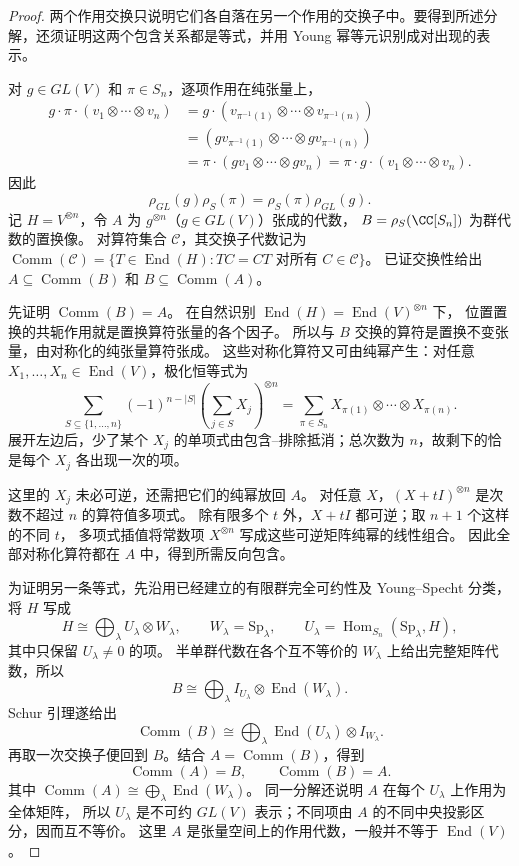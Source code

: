 \begin{proof}
两个作用交换只说明它们各自落在另一个作用的交换子中。要得到所述分解，还须证明这两个包含关系都是等式，并用 Young 幂等元识别成对出现的表示。

对 $g\in GL(V)$ 和 $\pi\in S_n$，逐项作用在纯张量上，
\begin{align*}
g\cdot\pi\cdot(v_1\otimes\cdots\otimes v_n)
&=g\cdot(v_{\pi^{-1}(1)}\otimes\cdots\otimes v_{\pi^{-1}(n)})\\
&=(gv_{\pi^{-1}(1)}\otimes\cdots\otimes gv_{\pi^{-1}(n)})\\
&=\pi\cdot(gv_1\otimes\cdots\otimes gv_n)
=\pi\cdot g\cdot(v_1\otimes\cdots\otimes v_n).
\end{align*}
因此
\[
\rho_{GL}(g)\rho_S(\pi)=\rho_S(\pi)\rho_{GL}(g).
\]
记 $H=V^{\otimes n}$，令 $A$ 为 $g^{\otimes n}$（$g\in GL(V)$）张成的代数，
$B=\rho_S(\CC[S_n])$ 为群代数的置换像。
对算符集合 $\mathcal C$，其交换子代数记为
$\operatorname{Comm}(\mathcal C)=\{T\in\operatorname{End}(H):TC=CT\text{ 对所有 }C\in\mathcal C\}$。
已证交换性给出 $A\subseteq\operatorname{Comm}(B)$ 和 $B\subseteq\operatorname{Comm}(A)$。

先证明 $\operatorname{Comm}(B)=A$。
在自然识别 $\operatorname{End}(H)=\operatorname{End}(V)^{\otimes n}$ 下，
位置置换的共轭作用就是置换算符张量的各个因子。
所以与 $B$ 交换的算符是置换不变张量，由对称化的纯张量算符张成。
这些对称化算符又可由纯幂产生：对任意 $X_1,\ldots,X_n\in\operatorname{End}(V)$，极化恒等式为
\[
\sum_{S\subseteq\{1,\ldots,n\}}(-1)^{n-|S|}
 \left(\sum_{j\in S}X_j\right)^{\otimes n}
=\sum_{\pi\in S_n}X_{\pi(1)}\otimes\cdots\otimes X_{\pi(n)}.
\]
展开左边后，少了某个 $X_j$ 的单项式由包含--排除抵消；总次数为 $n$，故剩下的恰是每个 $X_j$ 各出现一次的项。

这里的 $X_j$ 未必可逆，还需把它们的纯幂放回 $A$。
对任意 $X$，$(X+tI)^{\otimes n}$ 是次数不超过 $n$ 的算符值多项式。
除有限多个 $t$ 外，$X+tI$ 都可逆；取 $n+1$ 个这样的不同 $t$，
多项式插值将常数项 $X^{\otimes n}$ 写成这些可逆矩阵纯幂的线性组合。
因此全部对称化算符都在 $A$ 中，得到所需反向包含。

为证明另一条等式，先沿用已经建立的有限群完全可约性及 Young--Specht 分类，将 $H$ 写成
\[
H\cong\bigoplus_\lambda U_\lambda\otimes W_\lambda,
\qquad W_\lambda=\mathrm{Sp}_\lambda,
\qquad U_\lambda=\operatorname{Hom}_{S_n}(\mathrm{Sp}_\lambda,H),
\]
其中只保留 $U_\lambda\ne0$ 的项。
半单群代数在各个互不等价的 $W_\lambda$ 上给出完整矩阵代数，所以
\[
B\cong\bigoplus_\lambda I_{U_\lambda}\otimes\operatorname{End}(W_\lambda).
\]
Schur 引理遂给出
\[
\operatorname{Comm}(B)
\cong\bigoplus_\lambda\operatorname{End}(U_\lambda)\otimes I_{W_\lambda}.
\]
再取一次交换子便回到 $B$。结合 $A=\operatorname{Comm}(B)$，得到
\begin{equation}
\operatorname{Comm}(A)=B,
\qquad
\operatorname{Comm}(B)=A.
\label{eq:double-commutant}
\end{equation}
其中 $\operatorname{Comm}(A)\cong\bigoplus_\lambda\operatorname{End}(W_\lambda)$。
同一分解还说明 $A$ 在每个 $U_\lambda$ 上作用为全体矩阵，
所以 $U_\lambda$ 是不可约 $GL(V)$ 表示；不同项由 $A$ 的不同中央投影区分，因而互不等价。
这里 $A$ 是张量空间上的作用代数，一般并不等于 $\operatorname{End}(V)$。


\end{proof}
